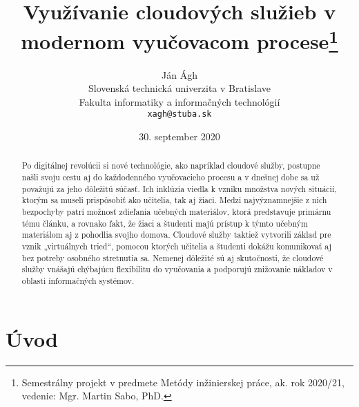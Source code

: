 \documentclass[10pt,twoside,slovak,a4paper]{article}
\title{Využívanie cloudových služieb v modernom vyučovacom procese\thanks{Semestrálny projekt v predmete Metódy inžinierskej práce, ak. rok 2020/21, vedenie: Mgr. Martin Sabo, PhD.}} %
\author{Ján Ágh\\[2pt]
	{\small Slovenská technická univerzita v Bratislave}\\
	{\small Fakulta informatiky a informačných technológií}\\
	{\small \texttt{xagh@stuba.sk}}
	}
\date{\small 30. september 2020} %
\begin{document}
\maketitle

\begin{abstract}

Po digitálnej revolúcii si nové technológie, ako napríklad cloudové služby, postupne
našli svoju cestu aj do každodenného vyučovacieho procesu a v dnešnej dobe sa už považujú
za jeho dôležitú súčasť. Ich inklúzia viedla k vzniku množstva nových situácií, ktorým sa
museli prispôsobiť ako učitelia, tak aj žiaci. Medzi najvýznamnejšie z nich bezpochyby patrí
možnosť zdieľania učebných materiálov, ktorá predstavuje primárnu tému článku, a rovnako
fakt, že žiaci a študenti majú prístup k týmto učebným materiálom aj z pohodlia svojho
domova. Cloudové služby taktiež vytvorili základ pre vznik „virtuálnych tried“, pomocou
ktorých učitelia a študenti dokážu komunikovať aj bez potreby osobného stretnutia sa.
Nemenej dôležité sú aj skutočnosti, že cloudové služby vnášajú chýbajúcu flexibilitu do
vyučovania a podporujú znižovanie nákladov v oblasti informačných systémov.

\end{abstract}



\section{Úvod}






\end{document}
